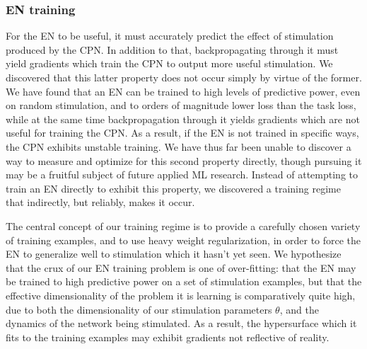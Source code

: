 \documentclass[12pt]{iopart}
\begin{document}
\subsubsection{EN training}
For the EN to be useful, it must accurately predict the effect of stimulation
produced by the CPN. In addition to that, backpropagating through it must yield
gradients which train the CPN to output more useful stimulation. We discovered that
this latter property does not occur simply by virtue of the former.
We have found that an EN can be trained to high levels of predictive power, even
on random stimulation, and to orders of magnitude lower loss than the task loss,
while at the same time backpropagation through it yields gradients which are not
useful for training the CPN. As a result, if the EN is not trained in specific ways,
the CPN exhibits unstable training. We have thus far been unable to discover a way
to measure and optimize for this second property directly, though pursuing it may be a
fruitful subject of future applied ML research. Instead of attempting to train an EN
directly to exhibit this property, we discovered a training regime that indirectly,
but reliably, makes it occur.

The central concept of our training regime is to provide a carefully chosen variety of
training examples, and to use heavy weight regularization, in order to force
the EN to generalize well to stimulation which it hasn't yet seen. We hypothesize that
the crux of our EN training problem is one of over-fitting: that the EN may be trained
to high predictive power on a set of stimulation examples, but that the effective
dimensionality of the problem it is learning is comparatively quite high, due to both
the dimensionality of our stimulation parameters $\theta$, and the dynamics of the
network being stimulated. As a result, the hypersurface which it fits to the training
examples may exhibit gradients not reflective of reality.
\end{document}
